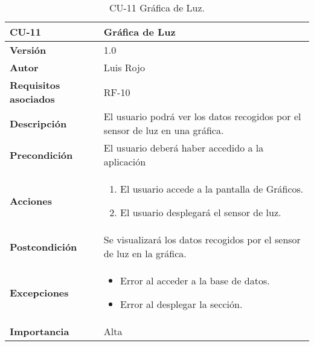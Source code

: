 \begin{table}[p]
	\centering
	\begin{tabularx}{\linewidth}{ p{} p{} }
		\toprule
		\textbf{CU-11}    & \textbf{Gráfica de Luz}\\
		\toprule
		\textbf{Versión}              & 1.0    \\
		\textbf{Autor}                & Luis Rojo \\
		\textbf{Requisitos asociados} & RF-10 \\
		\textbf{Descripción}          & El usuario podrá ver los datos recogidos por el sensor de luz en una gráfica. \\
		\textbf{Precondición}         &  El usuario deberá haber accedido a la aplicación \\
		\textbf{Acciones}             &
		\begin{enumerate}
			\def\labelenumi{\arabic{enumi}.}
			\tightlist
			\item El usuario accede a la pantalla de Gráficos.
                \item El usuario desplegará el sensor de luz.
		\end{enumerate}\\
		\textbf{Postcondición}        & Se visualizará los datos recogidos por el sensor de luz en la gráfica. \\
		\textbf{Excepciones}          &  
            \begin{itemize}
                \item Error al acceder a la base de datos.
                \item Error al desplegar la sección.
            \end{itemize}
           \\
		\textbf{Importancia}          & Alta  \\
		\bottomrule
	\end{tabularx}
	\caption{CU-11 Gráfica de Luz.}
\end{table}


